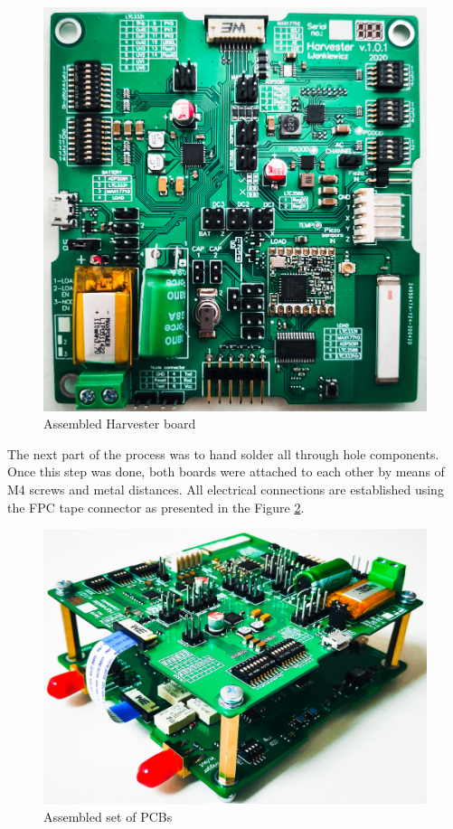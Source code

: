 \documentclass[12pt,a4paper]{article}
\begin{document}
\begin{figure}[ht!]
\includegraphics[scale=0.15]{harvester.jpg}
\caption{Assembled Harvester board}
\label{fig:harvesterreal}
\end{figure}

The next part of the process was to hand solder all through hole components. Once this step was done, both boards were attached to each other by means of M4 screws and metal distances. All electrical connections are established using the FPC tape connector as presented in the Figure \ref{fig:assembled}.

\begin{figure}[htb!]
\includegraphics[scale=0.17]{assembled.jpg}
\caption{Assembled set of PCBs}
\label{fig:assembled}
\end{figure}
\par
\end{document}
